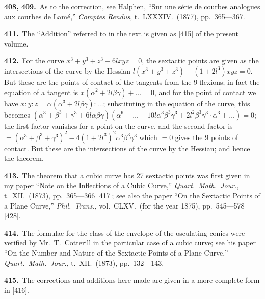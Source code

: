 \documentclass[11pt,a4paper]{article}
\theoremstyle{plain}
\theoremstyle{definition}
\theoremstyle{remark}
\begin{document}
\smallskip

\noindent\textbf{408, 409.}\ As to the correction, see Halphen, ``Sur une s\'{e}rie de courbes analogues aux courbes de Lam\'{e},'' \textit{Comptes Rendus}, t.~LXXXIV.\ (1877), pp.~365---367.

\smallskip

\noindent\textbf{411.}\ The ``Addition'' referred to in the text is given as [415] of the present volume.

\smallskip

\noindent\textbf{412.}\ For the curve $x^3+y^3+z^3+6lxyz=0$, the sextactic points are given as the intersections of the curve by the Hessian $l(x^3+y^3+z^3)-(1+2l^3)xyz=0$. But these are the points of contact of the tangents from the 9 flexions; in fact the equation of a tangent is $x(\alpha^2+2l\beta\gamma)+\ldots=0$, and for the point of contact we have $x:y:z=\alpha(\alpha^3+2l\beta\gamma):\ldots$; substituting in the equation of the curve, this becomes $(\alpha^3+\beta^3+\gamma^3+6l\alpha\beta\gamma)(\alpha^6+\ldots-10l\alpha^3\beta^3\gamma^3+2l^2\beta^3\gamma^3\cdot\alpha^3+\ldots)=0$; the first factor vanishes for a point on the curve, and the second factor is $=(\alpha^3+\beta^3+\gamma^3)^2-4(1+2l^3)^2\alpha^3\beta^3\gamma^3$ which $=0$ gives the 9 points of contact. But these are the intersections of the curve by the Hessian; and hence the theorem.

\smallskip

\noindent\textbf{413.}\ The theorem that a cubic curve has 27 sextactic points was first given in my paper ``Note on the Inflections of a Cubic Curve,'' \textit{Quart.\ Math.\ Jour.}, t.~XII.\ (1873), pp.~365---366 [417]; see also the paper ``On the Sextactic Points of a Plane Curve,'' \textit{Phil.\ Trans.}, vol.~CLXV.\ (for the year 1875), pp.~545---578 [428].

\smallskip

\noindent\textbf{414.}\ The formulae for the class of the envelope of the osculating conics were verified by Mr.\ T.\ Cotterill in the particular case of a cubic curve; see his paper ``On the Number and Nature of the Sextactic Points of a Plane Curve,'' \textit{Quart.\ Math.\ Jour.}, t.~XII.\ (1873), pp.~132---143.

\newpage
\setcounter{page}{624}

\smallskip

\noindent\textbf{415.}\ The corrections and additions here made are given in a more complete form in [416].

\smallskip
\end{document}

